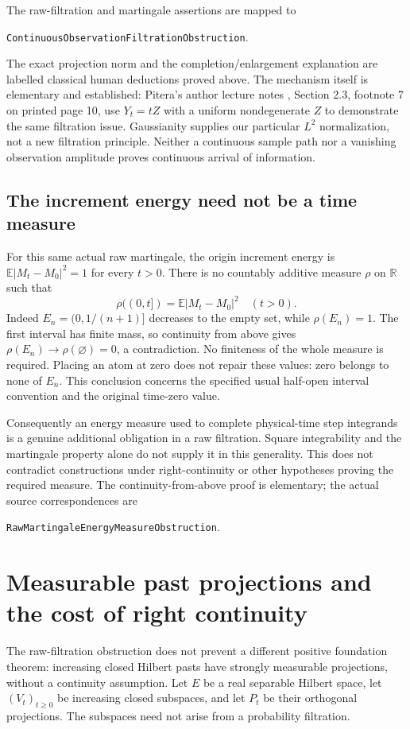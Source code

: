 \documentclass[11pt]{article}
\newcommand{\R}{\mathbb R}\newcommand{\E}{\mathbb E}
\newcommand{\code}[1]{{\small\nolinkurl{#1}}}
\begin{document}
The raw-filtration and martingale assertions are mapped to
\begin{center}\code{ContinuousObservationFiltrationObstruction}.\end{center}
The exact projection
norm and the completion/enlargement explanation are labelled classical
human deductions proved above. The mechanism itself is elementary
and established: Pitera's author lecture notes \cite{Pitera}, Section
2.3, footnote 7 on printed page 10, use $Y_t=tZ$ with a uniform
nondegenerate $Z$ to demonstrate the same filtration issue.
Gaussianity supplies our particular $L^2$ normalization, not a new
filtration principle. Neither a continuous sample path nor a vanishing
observation amplitude proves continuous arrival of information.

\subsection*{The increment energy need not be a time measure}
For this same actual raw martingale, the origin increment energy is
$\E|M_t-M_0|^2=1$ for every $t>0$. There is no countably additive
measure $\rho$ on $\R$ such that
\[
 \rho((0,t])=\E|M_t-M_0|^2\quad(t>0).
\]
Indeed $E_n=(0,1/(n+1)]$ decreases to the empty set, while
$\rho(E_n)=1$. The first interval has finite mass, so continuity
from above gives $\rho(E_n)\to\rho(\varnothing)=0$, a contradiction.
No finiteness of the whole measure is required. Placing an atom at
zero does not repair these values: zero belongs to none of $E_n$.
This conclusion concerns the specified usual half-open interval
convention and the original time-zero value.

Consequently an energy measure used to complete physical-time step
integrands is a genuine additional obligation in a raw filtration.
Square integrability and the martingale property alone do not supply
it in this generality. This does not contradict constructions under
right-continuity or other hypotheses proving the required measure.
The continuity-from-above proof is elementary; the actual source
correspondences are
\begin{center}\code{RawMartingaleEnergyMeasureObstruction}.\end{center}


\section{Measurable past projections and the cost of right continuity}\label{sec:monotonepast}
The raw-filtration obstruction does not prevent a different positive
foundation theorem: increasing closed Hilbert pasts have strongly
measurable projections, without a continuity assumption. Let $E$ be
a real separable Hilbert space, let $(V_t)_{t\ge0}$ be increasing
closed subspaces, and let $P_t$ be their orthogonal projections.
The subspaces need not arise from a probability filtration.
\end{document}
